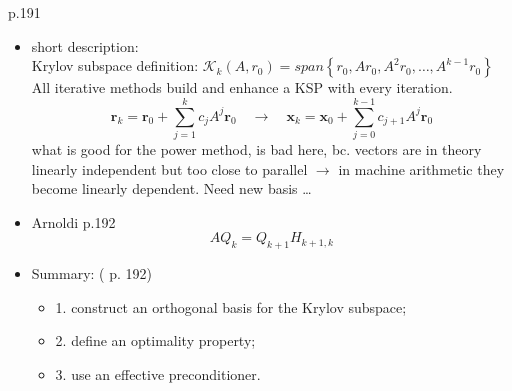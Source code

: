 \documentclass{scrartcl}
\numberwithin{equation}{section}
\begin{document}
\cite{Ascher:2011:FCN:2031413} p.191\\
\begin{itemize}
\item short description:\\
Krylov subspace definition: $\mathcal{K}_k(A, r_0) = span \left\{ r_0, Ar_0, A^2r_0,\ldots,A^{k-1}r_0 \right\}$\\

All iterative methods build and enhance a KSP with every iteration.
\begin{equation*}
\textbf{r}_k = \textbf{r}_0 + \sum_{j=1}^{k} c_jA^j\textbf{r}_0 \quad \to \quad \textbf{x}_k = \textbf{x}_0 + \sum_{j=0}^{k-1} c_{j+1}A^j\textbf{r}_0
\end{equation*}
what is good for the power method, is bad here, bc. vectors are in theory linearly independent but too close to parallel $\to$ in machine arithmetic they become linearly dependent. Need new basis \ldots 
\item Arnoldi \cite{Ascher:2011:FCN:2031413} p.192
\begin{equation*}
AQ_k = Q_{k+1}H_{k+1,k}
\end{equation*}
\item Summary: (\cite{Ascher:2011:FCN:2031413} p. 192)
	\begin{itemize}
	\item 1. construct an orthogonal basis for the Krylov subspace;
	\item 2. define an optimality property;
	\item 3. use an effective preconditioner.
	\end{itemize}
\end{itemize}
\end{document}
